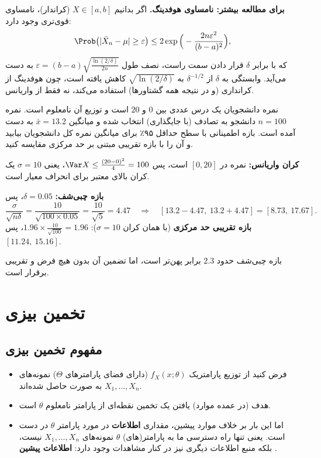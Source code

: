 \begin{note}
\notetitle \textbf{برای مطالعه بیشتر: نامساوی هوفدینگ.} اگر بدانیم $X\in[a,b]$ (کراندار)، نامساوی قوی‌تری وجود دارد:
\[
\Prob\big(|\bar X_n-\mu|\ge\varepsilon\big)\le2\exp\Big(-\frac{2n\varepsilon^2}{(b-a)^2}\Big),
\]
که با برابر $\delta$ قرار دادن سمت راست، نصف طول $\varepsilon=(b-a)\sqrt{\frac{\ln(2/\delta)}{2n}}$ به دست می‌آید. وابستگی به $\delta$ از $\delta^{-1/2}$ به $\sqrt{\ln(2/\delta)}$ کاهش یافته است، چون هوفدینگ از کرانداری (و در نتیجه همه گشتاورها) استفاده می‌کند، نه فقط از واریانس.
\end{note}

\begin{example}
نمره دانشجویان یک درس عددی بین $0$ و $20$ است و توزیع آن نامعلوم است. نمره $n=100$ دانشجو به تصادف (با جایگذاری) انتخاب شده و میانگین $\bar x=13.2$ به دست آمده است. بازه اطمینانی با سطح حداقل ۹۵٪ برای میانگین نمره کل دانشجویان بیابید و آن را با بازه تقریبی مبتنی بر حد مرکزی مقایسه کنید.
\begin{solution}
\textbf{کران واریانس:} نمره در $[0,20]$ است، پس $\Var X\le\frac{(20-0)^2}{4}=100$، یعنی $\sigma=10$ یک کران بالای معتبر برای انحراف معیار است.

\textbf{بازه چبی‌شف:} $\delta=0.05$، پس
\[
\frac{\sigma}{\sqrt{n\delta}}=\frac{10}{\sqrt{100\times0.05}}=\frac{10}{\sqrt5}=4.47
\quad\Rightarrow\quad[13.2-4.47,\ 13.2+4.47]=[8.73,\ 17.67].
\]
\textbf{بازه تقریبی حد مرکزی} (با همان کران $\sigma=10$): $1.96\times\frac{10}{\sqrt{100}}=1.96$، پس $[11.24,\ 15.16]$.

بازه چبی‌شف حدود $2.3$ برابر پهن‌تر است، اما تضمین آن بدون هیچ فرض و تقریبی برقرار است.
\end{solution}
\end{example}

\section{تخمین بیزی }

\subsection{مفهوم تخمین بیزی}
\begin{itemize}
\item فرض کنید از توزیع پارامتریک $f_X(x;\theta)$ (دارای فضای پارامترهای $\Theta$) نمونه‌های $X_1,\ldots,X_n$ به صورت  حاصل شده‌اند.
\item هدف (در عمده موارد) یافتن یک تخمین نقطه‌ای از پارامتر نامعلوم $\theta$ است.
\item اما این بار بر خلاف موارد پیشین، مقداری \textbf{اطلاعات } در مورد پارامتر $\theta$ در دست است. یعنی تنها راه دسترسی ما به پارامتر(های) $\theta$ نمونه‌های $X_1,\ldots,X_n$ نیست، بلکه منبع اطلاعات دیگری نیز در کنار مشاهدات وجود دارد: \textbf{اطلاعات پیشین }.
\end{itemize}

